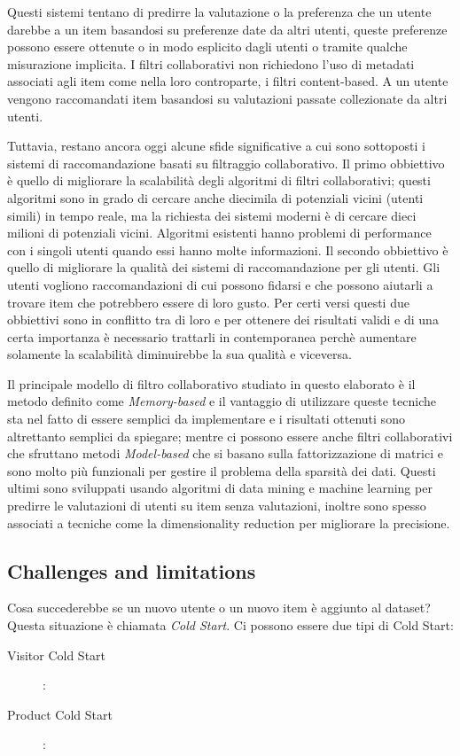 Questi sistemi tentano di predirre la valutazione o la preferenza che un utente darebbe a un item basandosi su preferenze date da altri 
utenti, queste preferenze possono essere ottenute o in modo esplicito dagli utenti o tramite qualche misurazione implicita. 
I filtri collaborativi non richiedono l'uso di metadati associati agli item come nella loro controparte, i filtri content-based. A un 
utente vengono raccomandati item basandosi su valutazioni passate collezionate da altri utenti.

Tuttavia, restano ancora oggi alcune sfide significative a cui sono sottoposti i sistemi di raccomandazione basati su 
filtraggio collaborativo.
Il primo obbiettivo è quello di migliorare la scalabilità degli algoritmi di filtri collaborativi; questi algoritmi sono in grado di cercare
anche diecimila di potenziali vicini (utenti simili) in tempo reale, ma la richiesta dei sistemi moderni è di cercare dieci milioni di 
potenziali vicini. Algoritmi esistenti hanno problemi di performance con i singoli utenti quando essi hanno molte informazioni.
Il secondo obbiettivo è quello di migliorare la qualità dei sistemi di raccomandazione per gli utenti. Gli utenti vogliono
raccomandazioni di cui possono fidarsi e che possono aiutarli a trovare item che potrebbero essere di loro gusto.
Per certi versi questi due obbiettivi sono in conflitto tra di loro e per ottenere dei risultati validi e di una certa importanza è 
necessario trattarli in contemporanea perchè aumentare solamente la scalabilità diminuirebbe la sua qualità e viceversa. 
\cite{item-based-collaborative-filtering} 

Il principale modello di filtro collaborativo studiato in questo elaborato è il metodo definito come \textit{Memory-based} e il 
vantaggio di utilizzare queste tecniche sta nel fatto di essere semplici da implementare e i risultati ottenuti sono altrettanto 
semplici da spiegare; mentre ci possono essere anche filtri collaborativi che sfruttano metodi \textit{Model-based} che si basano sulla 
fattorizzazione di matrici e sono molto più funzionali per gestire il problema della sparsità dei dati. Questi ultimi sono sviluppati
usando algoritmi di data mining e machine learning per predirre le valutazioni di utenti su item senza valutazioni, inoltre sono spesso 
associati a tecniche come la dimensionality reduction per migliorare la precisione.



\subsection{Challenges and limitations} \hfill \break
Cosa succederebbe se un nuovo utente o un nuovo item è aggiunto al dataset? Questa situazione è chiamata \textit{Cold Start}. Ci possono
essere due tipi di Cold Start:
\begin{description}
	\item[Visitor Cold Start]:
	\item[Product Cold Start]: 
\end{description}

